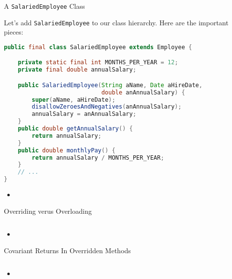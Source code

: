 \documentclass{beamer}
\author[Chris Simpkins] 
{Christopher Simpkins \\\texttt{chris.simpkins@gatech.edu}}
\institute[Georgia Tech] %
\date[CS 1331]{}
\title[\course] %
{\lesson}
\subtitle{}
\begin{document}
\begin{frame}
  \titlepage
\end{frame}


\begin{frame}[fragile]{A {\tt SalariedEmployee} Class}


Let's add {\tt SalariedEmployee} to our class hierarchy.  Here are the important pieces:
\begin{lstlisting}[language=Java]
public final class SalariedEmployee extends Employee {

    private static final int MONTHS_PER_YEAR = 12;
    private final double annualSalary;

    public SalariedEmployee(String aName, Date aHireDate,
                            double anAnnualSalary) {
        super(aName, aHireDate);
        disallowZeroesAndNegatives(anAnnualSalary);
        annualSalary = anAnnualSalary;
    }
    public double getAnnualSalary() {
        return annualSalary;
    }
    public double monthlyPay() {
        return annualSalary / MONTHS_PER_YEAR;
    }
    // ...
}
\end{lstlisting}

\begin{itemize}
\item
\end{itemize}


\end{frame}


\begin{frame}[fragile]{Overriding verus Overloading}


\begin{lstlisting}[language=Java]

\end{lstlisting}

\begin{itemize}
\item
\end{itemize}


\end{frame}


\begin{frame}[fragile]{Covariant Returns In Overridden Methods}


\begin{lstlisting}[language=Java]

\end{lstlisting}

\begin{itemize}
\item
\end{itemize}


\end{frame}
\end{document}
